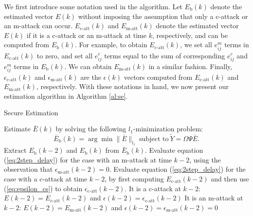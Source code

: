 We first introduce some notation used in the algorithm. Let $E_\text{b}(k)$ denote the estimated vector $E(k)$ without imposing the assumption that only a c-attack or an m-attack can occur.  $E_{\text{c-att}}(k)$ and $E_{\text{m-att}}(k)$ denote the estimated vector $E(k)$ if it is a c-attack or an m-attack at time $k$, respectively, and can be computed from $E_\text{b}(k)$. For example, to obtain $E_{\text{c-att}}(k)$, we set all $e^m_{ij}$ terms in $E_{\text{c-att}}(k)$ to zero, and set all $e^c_{ij}$ terms equal to the sum of corresponding $e^c_{ij}$ and $e^m_{ij}$ terms in $E_\text{b}(k)$. We can obtain $E_{\text{m-att}}(k)$ in a similar fashion. Finally, $\epsilon_{\text{c-att}}(k)$ and $\epsilon_{\text{m-att}}(k)$ are the $\epsilon(k)$ vectors computed from $E_{\text{c-att}}(k)$ and $E_{\text{m-att}}(k)$, respectively.
With these notations in hand, we now present our estimation algorithm in Algorithm \ref{al:se}.


\begin{algorithm}
\caption{Secure Estimation}
\label{al:se}
\begin{algorithmic}[1]
	\State Estimate $\bar E(k)$ by solving the following $l_1$-minimization problem:
		\begin{equation}
		\bar E_\text{b}(k) = \arg \min \| \bar E \|_{l_1} ~\text{subject to}~ \tilde Y = \Omega\Psi \bar E.
		\nonumber
		\end{equation}
	\State Extract $E_\text{b}(k-2)$ and $E_\text{b}(k)$ from $\bar E_\text{b}(k)$.
	\State Evaluate equation (\ref{eq:2step_delay}) for the case with an m-attack at time $k-2$, using the observation that $\epsilon_\text{m-att}(k-2) = 0$.
	\State Evaluate equation (\ref{eq:2step_delay}) for the case with a c-attack at time $k-2$, by first computing $E_\text{c-att}(k-2)$ and then use (\ref{eq:epsilon_cs}) to obtain $\epsilon_\text{c-att}(k-2)$.
		\State It is a c-attack at $k-2$: $E(k-2) = E_\text{c-att}(k-2)$ and $\epsilon(k-2) = \epsilon_\text{c-att}(k-2)$
	\Else
		\State It is an m-attack at $k-2$: $E(k-2) = E_\text{m-att}(k-2)$ and $\epsilon(k-2) = \epsilon_\text{m-att}(k-2)= 0$
	\EndIf
\EndFor
\end{algorithmic}
\end{algorithm}



